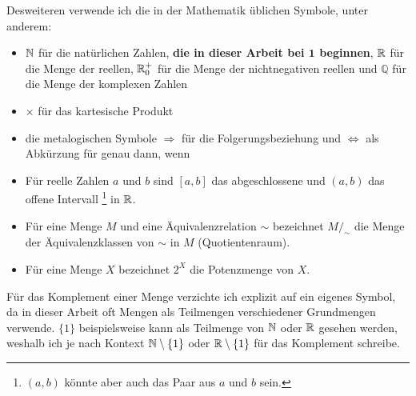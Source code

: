 Desweiteren verwende ich die in der Mathematik üblichen Symbole, unter anderem:
\begin{itemize}
    \item 
        $\mathbb{N}$ für die natürlichen Zahlen, \textbf{die in dieser Arbeit bei $\boldsymbol{1}$ beginnen}, $\mathbb{R}$ für die Menge der reellen, $\mathbb{R}_0^+$ für die Menge der nichtnegativen reellen und $\mathbb{Q}$ für die Menge der komplexen Zahlen
    \item
        $\times$ für das kartesische Produkt
    \item 
        die metalogischen Symbole $\Rightarrow$ für die Folgerungsbeziehung und $\Leftrightarrow$ als Abkürzung für \glqq genau dann, wenn\grqq
    \item
        Für reelle Zahlen $a$ und $b$ sind $[a,b]$ das abgeschlossene und $(a,b)$ das offene Intervall%
        \footnote{
            $(a,b)$ könnte aber auch das Paar aus $a$ und $b$ sein.
        }
        in $\mathbb{R}$.
    \item
        Für eine Menge $M$ und eine Äquivalenzrelation $\sim$ bezeichnet $M / _{\sim}$ die Menge der Äquivalenzklassen von $\sim$ in $M$ (Quotientenraum).
    \item
        Für eine Menge $X$ bezeichnet $2^X$ die Potenzmenge von $X$.
\end{itemize}

Für das Komplement einer Menge verzichte ich explizit auf ein eigenes Symbol, da in dieser Arbeit oft Mengen als Teilmengen verschiedener Grundmengen verwende. $\{1\}$ beispielsweise kann als Teilmenge von $\mathbb{N}$ oder $\mathbb{R}$ gesehen werden, weshalb ich je nach Kontext $\mathbb{N} \setminus \{1\}$ oder $\mathbb{R} \setminus \{1\}$ für das Komplement schreibe.
